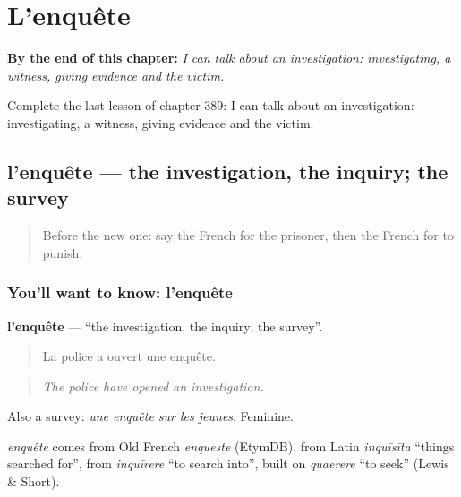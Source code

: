 
\chapter{L'enquête}
\label{ch:fr-l-enquete}

\begin{chapteropening}
\textbf{By the end of this chapter:} \emph{I can talk about an investigation: investigating, a witness, giving evidence and the victim.}

Complete the last lesson of chapter 389: I can talk about an investigation: investigating, a witness, giving evidence and the victim.
\end{chapteropening}

\section[l'enquête]{l'enquête — the investigation, the inquiry; the survey}

\label{lesson:FR-C389-enquete}



\begin{quote}
Before the new one: say the French for the prisoner, then the French for to punish.
\end{quote}

\subsection*{You'll want to know: l'enquête}
\textbf{l'enquête} — \textquotedblleft{}the investigation, the inquiry; the survey\textquotedblright{}.

\begin{quote}
La police a ouvert une enquête.
\end{quote}

\begin{quote}
\emph{The police have opened an investigation.}
\end{quote}

Also a survey: \emph{une enquête sur les jeunes}. Feminine.

\begin{cousinweb}
\emph{enquête} comes from Old French \emph{enqueste} (EtymDB), from Latin \emph{inquīsīta} \textquotedblleft{}things searched for\textquotedblright{}, from \emph{inquīrere} \textquotedblleft{}to search into\textquotedblright{}, built on \emph{quaerere} \textquotedblleft{}to seek\textquotedblright{} (Lewis \& Short).
\end{cousinweb}

